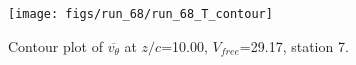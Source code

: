 \begin{figure}[H]
\centering
\texttt{[image: figs/run\_68/run\_68\_T\_contour]}
\caption{Contour plot of $\overline{v_{\theta}}$ at $z/c$=10.00, $V_{free}$=29.17, station 7.}
\label{fig:run_68_T_contour}
\end{figure}


